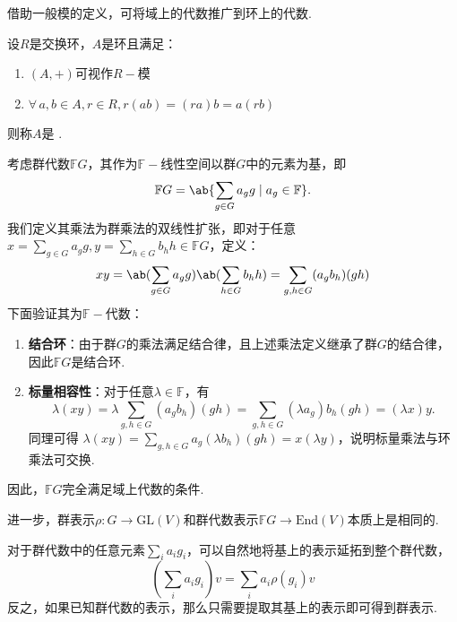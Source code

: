 借助一般模的定义，可将域上的代数推广到环上的代数.

\begin{definition}[环上的代数]
    设$R$是交换环，$A$是环且满足：
    \begin{enumerate}[label=(\roman*)]
        \item $(A, +)$可视作$R-\!\!$模
        \item $\forall\, a,b \in A, r \in R, r(ab) = (ra)b = a(rb)$
    \end{enumerate}
    则称$A$是 .
\end{definition}

\begin{instance}
    考虑群代数$\mathbb{F}G$，其作为$\mathbb{F}-\!\!$线性空间以群$G$中的元素为基，即
    \begin{equation*}
        \mathbb{F}G = \ab\{\sum_{g \in G} a_g g \mid a_g \in \mathbb{F}\}.
    \end{equation*}
    我们定义其乘法为群乘法的双线性扩张，即对于任意$x = \sum_{g \in G} a_g g, y = \sum_{h \in G} b_h h \in \mathbb{F}G$，定义：
    \[ xy = \ab(\sum_{g \in G} a_g g) \ab(\sum_{h \in G} b_h h) = \sum_{g,h \in G} (a_g b_h) (gh) \]
    下面验证其为$\mathbb{F}-\!\!$代数：
    \begin{enumerate}
        \item \textbf{结合环}：由于群$G$的乘法满足结合律，且上述乘法定义继承了群$G$的结合律，因此$\mathbb{F}G$是结合环.
        \item \textbf{标量相容性}：对于任意$\lambda \in \mathbb{F}$，有\begin{equation*}\lambda(xy) = \lambda \sum_{g,h \in G} (a_g b_h) (gh) = \sum_{g,h \in G} (\lambda a_g) b_h (gh) = (\lambda x) y.
        \end{equation*}
        同理可得 $\lambda(xy) = \sum_{g,h \in G} a_g (\lambda b_h) (gh) = x(\lambda y)$，说明标量乘法与环乘法可交换.
    \end{enumerate}
    因此，$\mathbb{F}G$完全满足域上代数的条件.\par
    进一步，群表示$\rho:G \to \mathrm{GL}(V)$和群代数表示$\mathbb{F}G \to \mathrm{End}(V)$本质上是相同的.\par
    对于群代数中的任意元素$\sum_{i}a_ig_i$，可以自然地将基上的表示延拓到整个群代数，
    \begin{equation*}
        \left(\sum_{i}a_ig_i\right)v = \sum_{i}a_i\rho(g_i)v
    \end{equation*}
    反之，如果已知群代数的表示，那么只需要提取其基上的表示即可得到群表示.\par

\end{instance}
